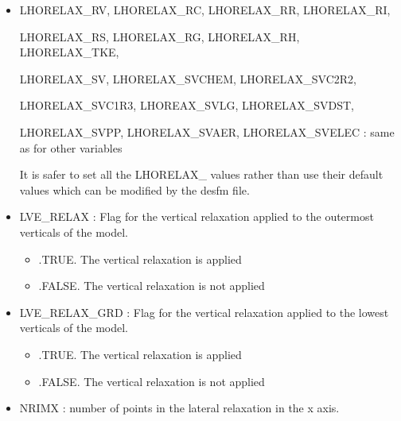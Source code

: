 \begin{itemize}
\item
{}
LHORELAX\_RV, LHORELAX\_RC, LHORELAX\_RR, LHORELAX\_RI,


LHORELAX\_RS, LHORELAX\_RG, LHORELAX\_RH, LHORELAX\_TKE,


LHORELAX\_SV, LHORELAX\_SVCHEM, LHORELAX\_SVC2R2,


LHORELAX\_SVC1R3, LHOREAX\_SVLG, LHORELAX\_SVDST,


LHORELAX\_SVPP, LHORELAX\_SVAER, LHORELAX\_SVELEC : same as for other variables

It is safer to set all the LHORELAX\_ values rather than
use their default values which can be modified by the desfm file.

\item
{}
LVE\_RELAX : Flag for the vertical relaxation applied to the outermost
verticals of the model. 
\begin{itemize}
\item   .TRUE. The vertical  relaxation is applied 
\item   .FALSE. The vertical    relaxation is not applied 
\end{itemize}

\item
{}
LVE\_RELAX\_GRD : Flag for the vertical relaxation applied to the lowest
verticals of the model. 
\begin{itemize}
\item   .TRUE. The vertical  relaxation is applied 
\item   .FALSE. The vertical    relaxation is not applied 
\end{itemize}


\item
{}
NRIMX : number of points  in the lateral relaxation  in the x axis. 


\end{itemize}
